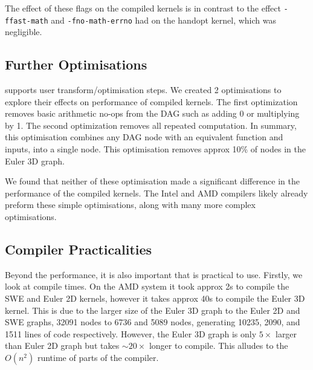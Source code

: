 The effect of these flags on the compiled kernels is in contrast to the effect \texttt{-ffast-math} and \texttt{-fno-math-errno} had on the handopt kernel, which was negligible.

\subsection{Further Optimisations}

\phlat supports user transform/optimisation steps.
We created 2 optimisations to explore their effects on performance of compiled kernels.
The first optimization removes basic arithmetic no-ops from the DAG such as adding 0 or multiplying by 1.
The second optimization removes all repeated computation.
In summary, this optimisation combines any DAG node with an equivalent function and inputs, into a single node.
This optimisation removes approx 10\% of nodes in the Euler 3D graph.

We found that neither of these optimisation made a significant difference in the performance of the compiled kernels.
The Intel and AMD compilers likely already preform these simple optimisations, along with many more complex optimisations.

\subsection{Compiler Practicalities} \label{sec:practical}
Beyond the performance, it is also important that \phlat is practical to use.
Firstly, we look at compile times.
On the AMD system it took approx 2s to compile the SWE and Euler 2D kernels, however it takes approx 40s to compile the Euler 3D kernel.
This is due to the larger size of the Euler 3D graph to the Euler 2D and SWE graphs, 32091 nodes to 6736 and 5089 nodes, generating 10235, 2090, and 1511 lines of code respectively.
However, the Euler 3D graph is only $5\times$ larger than Euler 2D graph but takes $\sim 20\times$ longer to compile.
This alludes to the $O(n^2)$ runtime of parts of the compiler.

